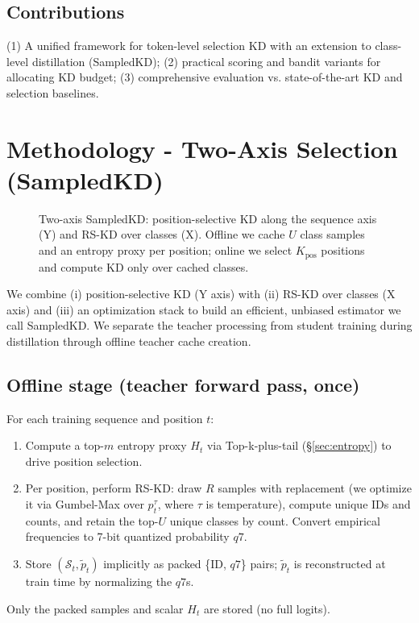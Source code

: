 \documentclass[11pt]{article}
\begin{document}
\subsection{Contributions}
(1) A unified framework for token-level selection KD with an extension to class-level distillation (SampledKD);
(2) practical scoring and bandit variants for allocating KD budget;
(3) comprehensive evaluation vs. state-of-the-art KD and selection baselines.


\section{Methodology - Two-Axis Selection (SampledKD)}

\FloatBarrier

\label{sec:twoaxis}
\begin{figure}[h!]
	\centering
	\resizebox{\columnwidth}{!}{}
	\resizebox{\columnwidth}{!}{}
	\caption{Two-axis SampledKD: position-selective KD along the sequence axis (Y) and RS-KD over classes (X). Offline we cache $U$ class samples and an entropy proxy per position; online we select $K_{\text{pos}}$ positions and compute KD only over cached classes.}
	\label{fig:two-axis}
\end{figure}

\FloatBarrier

We combine (i) position-selective KD (Y axis) with (ii) RS-KD over classes (X axis) and (iii) an optimization stack to build an efficient, unbiased estimator we call SampledKD.
We separate the teacher processing from student training during distillation through offline teacher cache creation.

\subsection{Offline stage (teacher forward pass, once)}
For each training sequence and position $t$:
\begin{enumerate}
	\item Compute a top-$m$ entropy proxy $H_t$ via Top-k-plus-tail (\S\ref{sec:entropy}) to drive position selection.
	\item Per position, perform RS-KD: draw $R$ samples with replacement (we optimize it via Gumbel-Max over $p_t^\tau$, where $\tau$ is temperature), compute unique IDs and counts, and retain the top-$U$ unique classes by count.
	      Convert empirical frequencies to 7-bit quantized probability $q7$.
	\item Store $(\mathcal{S}_t,\tilde p_t)$ implicitly as packed \{ID, $q7$\} pairs; $\tilde p_t$ is reconstructed at train time by normalizing the $q7$s.
\end{enumerate}
Only the packed samples and scalar $H_t$ are stored (no full logits).
\end{document}
